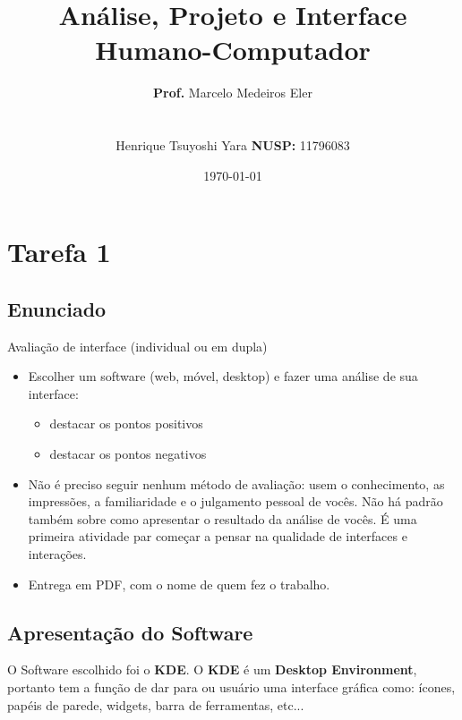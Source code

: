\documentclass[10pt]{article}
\title{{\titlefont Análise, Projeto e Interface Humano-Computador}}
\author{\textbf{Prof.} Marcelo Medeiros Eler \\ \\ \\ Henrique Tsuyoshi Yara \textbf{NUSP:} 11796083}
\date{{\datafont \today}}
\begin{document}
\graphicspath{ {./images/} }


\null  %
\nointerlineskip  %
\vfill
\let\snewpage \newpage
\let\newpage \relax
\maketitle
\let \newpage \snewpage
\vfill 
\break %
\setlength{\parindent}{5ex}
\newpage

\tableofcontents

\newpage

\section{Tarefa 1}

\subsection{Enunciado} \hfill

Avaliação de interface (individual ou em dupla)

\begin{itemize}
    \item Escolher um software (web, móvel, desktop) e fazer uma análise de sua interface:
    \begin{itemize}
        \item destacar os pontos positivos
        \item destacar os pontos negativos
    \end{itemize}
    \item Não é preciso seguir nenhum método de avaliação: usem o conhecimento, as impressões, a familiaridade e o julgamento pessoal de vocês. Não há padrão também sobre como apresentar o resultado da análise de vocês. É uma primeira atividade par começar a pensar na qualidade de interfaces e interações.
    \item Entrega em PDF, com o nome de quem fez o trabalho.
\end{itemize}

\newpage

\subsection{Apresentação do Software} \hfill

O Software escolhido foi o \textbf{KDE}. O \textbf{KDE} é um \textbf{Desktop Environment}, portanto tem a função de dar para ou usuário uma interface gráfica como: ícones, papéis de parede, widgets, barra de ferramentas, etc...
\end{document}
